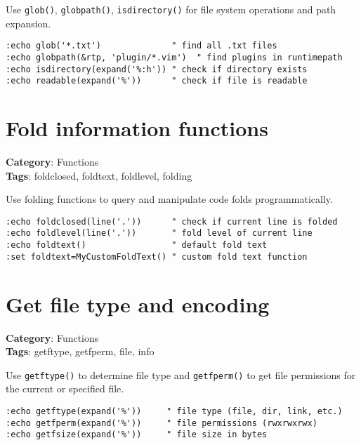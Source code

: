 {Use {\footnotesize \Verb§glob()§}, {\footnotesize \Verb§globpath()§}, {\footnotesize \Verb§isdirectory()§} for file system operations and path expansion.

\begin{Exa*}{}
\begin{Verbatim}[fontsize=\footnotesize, breaklines, breakanywhere]
:echo glob('*.txt')              " find all .txt files
:echo globpath(&rtp, 'plugin/*.vim')  " find plugins in runtimepath
:echo isdirectory(expand('%:h')) " check if directory exists
:echo readable(expand('%'))      " check if file is readable
\end{Verbatim}
\end{Exa*}

\section{Fold information functions}

\textbf{Category}: Functions\\ \textbf{Tags}: foldclosed, foldtext, foldlevel, folding
\vspace{0.5cm}

Use folding functions to query and manipulate code folds programmatically.

\begin{Exa*}{}
\begin{Verbatim}[fontsize=\footnotesize, breaklines, breakanywhere]
:echo foldclosed(line('.'))      " check if current line is folded
:echo foldlevel(line('.'))       " fold level of current line
:echo foldtext()                 " default fold text
:set foldtext=MyCustomFoldText() " custom fold text function
\end{Verbatim}
\end{Exa*}

\section{Get file type and encoding}

\textbf{Category}: Functions\\ \textbf{Tags}: getftype, getfperm, file, info
\vspace{0.5cm}

Use {\footnotesize \Verb§getftype()§} to determine file type and {\footnotesize \Verb§getfperm()§} to get file permissions for the current or specified file.

\begin{Exa*}{}
\begin{Verbatim}[fontsize=\footnotesize, breaklines, breakanywhere]
:echo getftype(expand('%'))     " file type (file, dir, link, etc.)
:echo getfperm(expand('%'))     " file permissions (rwxrwxrwx)
:echo getfsize(expand('%'))     " file size in bytes
\end{Verbatim}
\end{Exa*}

}
